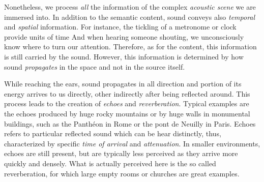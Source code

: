 
\mynewline
Nonetheless, we process \textit{all} the information of the complex \textit{acoustic scene} we are immersed into.
In addition to the semantic content, sound conveys also \textit{temporal} and \textit{spatial} information.
For instance, the tickling of a metronome or clock provide units of time
And when hearing someone shouting, we unconsciously know where to turn our attention.
Therefore, as for the content, this information is still carried by the sound.
However, this information is determined by how sound \textit{propagates} in the space and not in the source itself.

\mynewline
While reaching the ears, sound propagates in all direction and portion of its energy arrives to us directly, other indirectly after being reflected around.
This process leads to the creation of \textit{echoes} and \textit{reverberation}.
Typical examples are the echoes produced by huge rocky mountains or by huge walls in monumental buildings, such as the Panthéon in Rome or the pont de Neuilly in Paris.
Echoes refers to particular reflected sound which can be hear distinctly, thus, characterized by specific \textit{time of arrival} and \textit{attenuation}.
In smaller environments, echoes are still present, but are typically less perceived as they arrive more quickly and densely.
What is actually perceived here is the so called reverberation, for which large empty rooms or churches are great examples.

